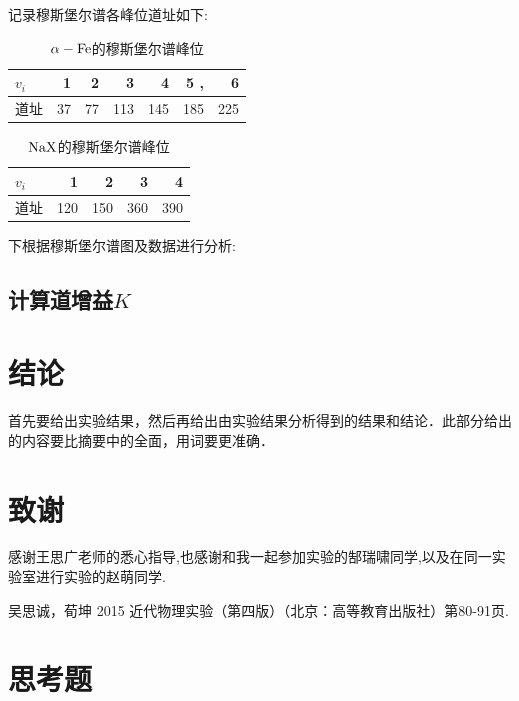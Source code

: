 \documentclass[aps,pre,12pt,preprint,onecolumn,showpacs,showkeys]{revtex4-1}
\begin{document}
记录穆斯堡尔谱各峰位道址如下:\par
\begin{table}[htbp]
    \begin{ruledtabular}
    \centering
        \begin{tabular}{lrrrrrr}
            \toprule
            {$v_i$} &   1 &    2 &    3 &    4 &    5 ,&    6 \\
            \midrule
            道址 &  37 &  77 &  113 &  145 &  185 &  225 \\
            \bottomrule
        \end{tabular}
    \end{ruledtabular}
    \caption{$\alpha-\rm{Fe}$的穆斯堡尔谱峰位}
\end{table}
\begin{table}[htbp]
    \begin{ruledtabular}
    \centering
        \begin{tabular}{lrrrr}
            \toprule
            {$v_i$} &    1 &    2 &    3 &    4 \\
            \midrule
            道址 &  120 &  150 &  360 &  390 \\
            \bottomrule
        \end{tabular}
    \end{ruledtabular}
    \caption{$\rm{NaX}$的穆斯堡尔谱峰位}
\end{table}
下根据穆斯堡尔谱图及数据进行分析:
\subsection{计算道增益$K$}
\section{结论}
首先要给出实验结果，然后再给出由实验结果分析得到的结果和结论．此部分给出的内容要比摘要中的全面，用词要更准确．\par

\section{致谢}
感谢王思广老师的悉心指导,也感谢和我一起参加实验的郜瑞啸同学,以及在同一实验室进行实验的赵萌同学.
%
\begin{thebibliography}{}
 吴思诚，荀坤 2015 近代物理实验（第四版）（北京：高等教育出版社）第80-91页.

\end{thebibliography}

\clearpage
\appendix
\section{思考题}
\end{document}
